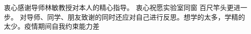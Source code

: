 \begin{acknowledgement}
    衷心感谢导师林敏教授对本人的精心指导。
    衷心祝愿实验室同窗 百尺竿头更进一步。
    对导师、同学、朋友致谢的同时还应对自己进行反思。想学的太多，学精的太少。疫情期间自我约束能力差
\end{acknowledgement}
